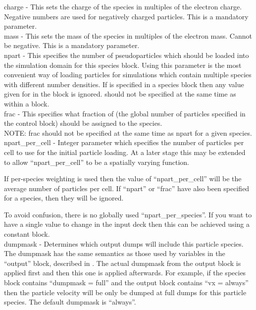 {\emphtext charge} - This sets the charge of the species in
multiples of the electron charge. Negative numbers are used for negatively
charged particles. This is a mandatory parameter.\\

{\emphtext mass} - This sets the mass of the species in multiples
of the electron mass. Cannot be negative. This is a mandatory parameter.\\

{\emphtext npart} - This specifies the number of pseudoparticles
which should be loaded into the simulation domain for this species block.
Using this parameter is the most convenient way of loading particles for
simulations which contain multiple species with different number densities.
If  is specified in a species block then any value
given for  in the  block is ignored.
 should not be specified at the same time
as  within a  block.\\

{\emphtext frac} - This specifies what fraction of  (the
global number of particles specified in the control block) should be assigned
to the species.\\

{\emphtext NOTE: frac should not be specified at the same time as npart for a
given species.}\\

{\emphtext npart\_per\_cell} - Integer parameter which specifies
the number of particles per cell to use for the initial particle loading.
At a later stage this may be extended to allow ``npart\_per\_cell'' to be
a spatially varying function.

If per-species weighting is used then the value of ``npart\_per\_cell'' will
be the average number of particles per cell.  If ``npart'' or ``frac'' have
also been specified for a species, then they will be ignored.

To avoid confusion, there is no globally used ``npart\_per\_species''.  If you
want to have a single value to change in the input deck then this can be
achieved using a constant block.\\

{\emphtext dumpmask} - Determines which output dumps will include this
particle species. The dumpmask has the same semantics as those used
by variables in the ``output'' block, described in .
The actual dumpmask from the output block is applied first and then
this one is applied afterwards. For example, if the species block contains
``dumpmask = full'' and the output block contains ``vx = always''
then the particle velocity will be only be dumped at full dumps for
this particle species. The default dumpmask is ``always''.\\

